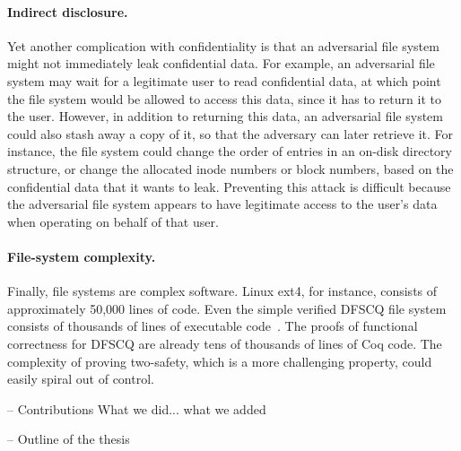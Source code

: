 \paragraph{Indirect disclosure.}
Yet another complication with confidentiality is that an adversarial
file system might not immediately leak confidential data.  For example,
an adversarial file system may wait for a legitimate user to read
confidential data, at which point the file system would be allowed to
access this data, since it has to return it to the user.  However, in
addition to returning this data, an adversarial file system could also
stash away a copy of it, so that the adversary can later retrieve it.
For instance, the file system could change the order of entries in an
on-disk directory structure, or change the allocated inode numbers or
block numbers, based on the confidential data that it wants to leak.
Preventing this attack is difficult because the adversarial file system
appears to have legitimate access to the user's data when operating on
behalf of that user.

\paragraph{File-system complexity.}
Finally, file systems are complex software.  Linux ext4, for
instance, consists of approximately 50,000 lines of code.  Even the simple
verified DFSCQ file system consists of thousands of lines of executable
code~\cite{chen:dfscq}.  The proofs of functional correctness for DFSCQ
are already tens of thousands of lines of Coq code.  The complexity of
proving two-safety, which is a more challenging property, could easily
spiral out of control.


-- Contributions
What we did... what we added

-- Outline of the thesis
